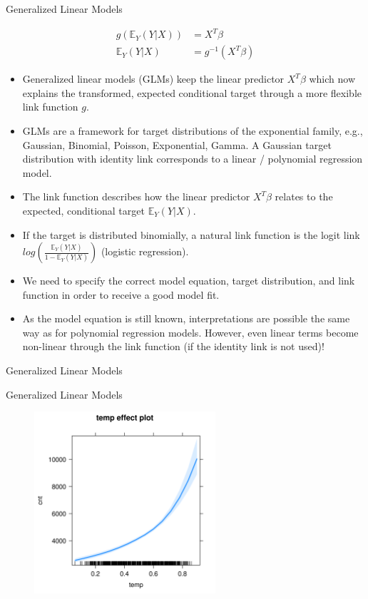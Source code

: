 \documentclass[11pt,compress,t,notes=noshow, xcolor=table]{beamer}
\begin{document}
\begin{vbframe}{Generalized Linear Models}

\begin{align*}
g\left(\mathbb{E}_Y(Y \vert X)\right) &= X^T\beta \\
\mathbb{E}_Y \left(Y \vert X\right) &= g^{-1}(X^T\beta) 
\end{align*}
\begin{itemize}
\setlength\itemsep{2em}
\item Generalized linear models (GLMs) keep the linear predictor $X^T\beta$ which now explains the transformed, expected conditional target through a more flexible link function $g$.
\item GLMs are a framework for target distributions of the exponential family, e.g., Gaussian, Binomial, Poisson, Exponential, Gamma. A Gaussian target distribution with identity link corresponds to a linear / polynomial regression model.
\item The link function describes how the linear predictor $X^T\beta$ relates to the expected, conditional target $\mathbb{E}_Y(Y \vert X)$.
\item If the target is distributed binomially, a natural link function is the logit link $log\left(\frac{\mathbb{E}_Y(Y \vert X)}{1 - \mathbb{E}_Y(Y \vert X)}\right)$ (logistic regression).
\item We need to specify the correct model equation, target distribution, and link function in order to receive a good model fit.
\item As the model equation is still known, interpretations are possible the same way as for polynomial regression models. However, even linear terms become non-linear through the link function (if the identity link is not used)!
\end{itemize}
\end{vbframe}


\begin{vbframe}{Generalized Linear Models}
\tiny

\end{vbframe}

\begin{vbframe}{Generalized Linear Models}
\begin{figure}
  \includegraphics[width = 0.6\textwidth]{figure/glm_effect_plot.png}
\end{figure}
\end{vbframe}
\end{document}
